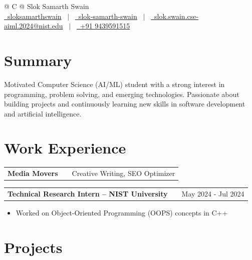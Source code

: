 \documentclass[a4paper,12pt]{article}
\makeatletter
\newenvironment{jobshort}[2]
    {
    \begin{tabularx}{\linewidth}{@{}l X r@{}}
    \textbf{#1} & \hfill &  #2 \\[3.75pt]
    \end{tabularx}
    }
    {
    }
\newenvironment{joblong}[2]
    {
    \begin{tabularx}{\linewidth}{@{}l X r@{}}
    \textbf{#1} & \hfill &  #2 \\[3.75pt]
    \end{tabularx}
    \begin{minipage}[t]{\linewidth}
    \begin{itemize}[nosep,after=\strut, leftmargin=1em, itemsep=3pt,label=--]
    }
    {
    \end{itemize}
    \end{minipage}    
    }
\makeatother
\begin{document}
\pagestyle{empty}


\begin{tabularx}{\linewidth}{@{} C @{}}
\Huge{Slok Samarth Swain} \\[7.5pt]

\href{https://github.com/sloksamarthswain}{\raisebox{-0.05\height}\faGithub\ sloksamarthswain} \ $|$ \ 
\href{https://www.linkedin.com/in/slok-samarth-swain-03264b369}{\raisebox{-0.05\height}\faLinkedin\ slok-samarth-swain} \ $|$ \ 
\href{mailto:slok.swain.cse-aiml.2024@nist.edu}{\raisebox{-0.05\height}\faEnvelope \ slok.swain.cse-aiml.2024@nist.edu} \ $|$ \ 
\href{tel:+919439591515}{\raisebox{-0.05\height}\faMobile \ +91 9439591515} \\
\end{tabularx}


\section{Summary}
Motivated Computer Science (AI/ML) student with a strong interest in programming, problem solving, and emerging technologies. Passionate about building projects and continuously learning new skills in software development and artificial intelligence.


\section{Work Experience}

\begin{jobshort}{Media Movers}{Creative Writing, SEO Optimizer}
\end{jobshort}

\begin{joblong}{Technical Research Intern -- NIST University}{May 2024 - Jul 2024}
\item Worked on Object-Oriented Programming (OOPS) concepts in C++
\end{joblong}


\section{Projects}
\end{document}
